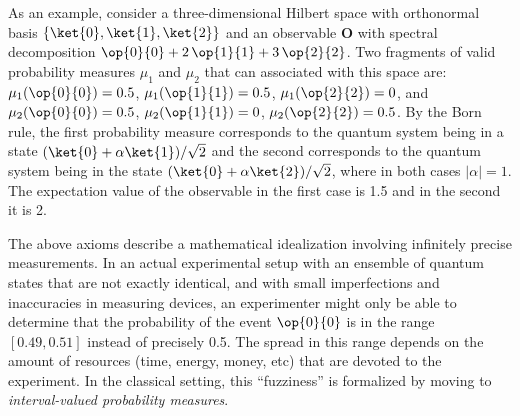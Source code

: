 \documentclass[english,reprint, aps, prl,superscriptaddress, showpacs,
showkeys, longbibliography, amsmath, amssymb]{revtex4-1}
\theoremstyle{plain}
\theoremstyle{definition}
\newcommand{\events}{\ensuremath{\mathcal{E}}}
\newcommand{\proj}[1]{\op{#1}{#1}}
\newcommand{\Tr}{\ensuremath{\mathop{\mathrm{Tr}}\nolimits}}
\newcommand{\nb}{\nolinebreak[1] }
\begin{document}
As an example, consider a three-dimensional Hilbert space with
orthonormal basis $\{\ket{0},\ket{1},\ket{2}\}$ and an observable
$\mathbf{O}$ with spectral decomposition
$\proj{0} + 2\,\proj{1} + 3\,\proj{2}$. Two fragments of valid
probability measures $\mu_1$ and $\mu_2$ that can associated with this
space are: $\mu_1(\proj{0}) = 0.5$, $\mu_1(\proj{1}) = 0.5$,
$\mu_1(\proj{2}) = 0$, and $\mu_2(\proj{0}) = 0.5$,
$\mu_2(\proj{1}) = 0$, $\mu_2(\proj{2}) = 0.5$. By the Born rule, the
first probability measure corresponds to the quantum system being in a
state $(\ket{0}+\alpha\ket{1})/\sqrt{2}$ and the second corresponds to
the quantum system being in the state
$(\ket{0}+\alpha\ket{2})/\sqrt{2}$, where in both cases
$|\alpha|=1$. The expectation value of the observable in the first
case is 1.5 and in the second it is 2.

The above axioms describe a mathematical idealization involving
infinitely precise measurements. In an actual experimental setup with
an ensemble of quantum states that are not exactly identical, and with
small imperfections and inaccuracies in measuring devices, an
experimenter might only be able to determine that the probability of
the event $\proj{0}$ is in the range $[0.49,0.51]$ instead of
precisely 0.5. The spread in this range depends on the amount of
resources (time, energy, money, etc) that are devoted to the
experiment. In the classical setting, this ``fuzziness'' is formalized
by moving to \emph{interval-valued probability measures}.

\end{document}
